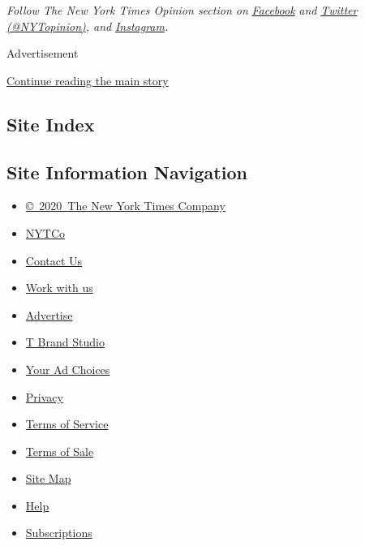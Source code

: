 \emph{Follow The New York Times Opinion section on}
\href{https://www.facebookcorewwwi.onion/nytopinion}{\emph{Facebook}}
\emph{and} \href{http://twitter.com/NYTOpinion}{\emph{Twitter
(@NYTopinion)}}\emph{, and}
\href{https://www.instagram.com/nytopinion/}{\emph{Instagram}}\emph{.}

Advertisement

\protect\hyperlink{after-bottom}{Continue reading the main story}

\hypertarget{site-index}{%
\subsection{Site Index}\label{site-index}}

\hypertarget{site-information-navigation}{%
\subsection{Site Information
Navigation}\label{site-information-navigation}}

\begin{itemize}
\tightlist
\item
  \href{https://help.nytimes3xbfgragh.onion/hc/en-us/articles/115014792127-Copyright-notice}{©~2020~The
  New York Times Company}
\end{itemize}

\begin{itemize}
\tightlist
\item
  \href{https://www.nytco.com/}{NYTCo}
\item
  \href{https://help.nytimes3xbfgragh.onion/hc/en-us/articles/115015385887-Contact-Us}{Contact
  Us}
\item
  \href{https://www.nytco.com/careers/}{Work with us}
\item
  \href{https://nytmediakit.com/}{Advertise}
\item
  \href{http://www.tbrandstudio.com/}{T Brand Studio}
\item
  \href{https://www.nytimes3xbfgragh.onion/privacy/cookie-policy\#how-do-i-manage-trackers}{Your
  Ad Choices}
\item
  \href{https://www.nytimes3xbfgragh.onion/privacy}{Privacy}
\item
  \href{https://help.nytimes3xbfgragh.onion/hc/en-us/articles/115014893428-Terms-of-service}{Terms
  of Service}
\item
  \href{https://help.nytimes3xbfgragh.onion/hc/en-us/articles/115014893968-Terms-of-sale}{Terms
  of Sale}
\item
  \href{https://spiderbites.nytimes3xbfgragh.onion}{Site Map}
\item
  \href{https://help.nytimes3xbfgragh.onion/hc/en-us}{Help}
\item
  \href{https://www.nytimes3xbfgragh.onion/subscription?campaignId=37WXW}{Subscriptions}
\end{itemize}
